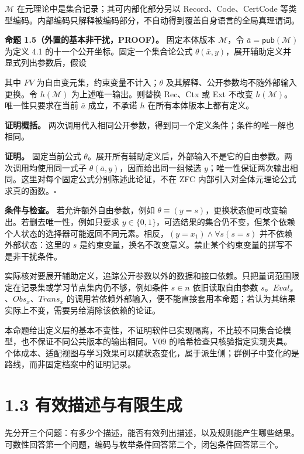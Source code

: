 \documentclass[UTF8,a4paper,zihao=-4,fontset=windows,openany]{ctexbook}
\newcommand{\mcsdisplay}[1]{%
  \par\addvspace{0.7em}%
  \sbox{\mcsmathbox}{\ensuremath{\displaystyle #1}}%
  \ifdim\wd\mcsmathbox>\linewidth
    \noindent\resizebox{\linewidth}{!}{\usebox{\mcsmathbox}}%
  \else
    \noindent\hspace*{\fill}\usebox{\mcsmathbox}\hspace*{\fill}%
  \fi
  \par\addvspace{0.7em}%
}
\def\ensuremath#1{#1}%
\def\operatorname#1{#1}%
\begin{document}
\(\mathcal M\) 在元理论中是集合记录；其可内部化部分另以 Record、Code、CertCode 等类型编码。内部编码只解释被编码部分，不自动得到覆盖自身语言的全局真理谓词。

\textbf{命题 1.5（外置的基本非干扰，PROOF）。} 固定本体版本 \(\mathcal M\)，令 \(\bar a=\mathsf{pub}(\mathcal M)\) 为定义 4.1 的十一个公开坐标。固定一个集合论公式 \(\theta(\bar x,y)\)，展开辅助定义并显式列出参数后，假设


\mcsdisplay{\operatorname{FV}(\theta)\subseteq\{x_1,\ldots,x_k,y\},
\qquad \exists!y\,\theta(\bar a,y).}
\noindent 其中 \(\operatorname{FV}\) 为自由变元集，约束变量不计入；\(\theta\) 及其解释、公开参数均不随外部输入更换。令 \(h(\mathcal M)\) 为上述唯一输出。则替换 Rec、Ctx 或 Ext 不改变 \(h(\mathcal M)\)。唯一性只要求在当前 \(\bar a\) 成立，不承诺 \(h\) 在所有本体版本上都有定义。

\textbf{证明概括。} 两次调用代入相同公开参数，得到同一个定义条件；条件的唯一解也相同。

\textbf{证明。} 固定当前公式 \(\theta\)。展开所有辅助定义后，外部输入不是它的自由参数。两次调用均使用同一式子 \(\theta(\bar a,y)\)，因而给出同一组候选 \(y\)；唯一性保证两次输出相同。这里对每个固定公式分别陈述此论证，不在 ZFC 内部引入对全体元理论公式求真的函数。\(\square\)

\textbf{条件与检查。} 若允许额外自由参数，例如 \(\theta\equiv(y=s)\)，更换状态便可改变输出。若删去唯一性，例如只要求 \(y\in\{0,1\}\)，可选结果的集合仍不变，但某个依赖个人状态的选择器可能返回不同元素。相反，\((y=x_1)\land\forall s(s=s)\) 并不依赖外部状态：这里的 \(s\) 是约束变量，换名不改变意义。禁止某个约束变量的拼写不是非干扰条件。

实际核对要展开辅助定义，追踪公开参数以外的数据和接口依赖。只把量词范围限定在记录集或学习节点集内仍不够，例如条件 \(s\in n\) 依旧读取自由参数 \(s\)。\(\operatorname{Eval}_x\)、\(\operatorname{Obs}_x\)、\(\operatorname{Trans}_x\) 的调用若依赖外部输入，便不能直接套用本命题；若认为其结果实际上不变，需要另给消除该依赖的论证。

本命题给出定义层的基本不变性，不证明软件已实现隔离，不比较不同集合论模型，也不保证不同公共版本的输出相同。V09 的哈希检查只核验指定实现夹具。个体成本、适配视图与学习效果可以随状态变化，属于派生侧；群例子中变化的是路线，而非固定档案中的证明记录。

\section{1.3 有效描述与有限生成}
先分开三个问题：有多少个描述，能否有效列出描述，以及规则能产生哪些结果。可数性回答第一个问题，编码与枚举条件回答第二个，闭包条件回答第三个。
\end{document}
